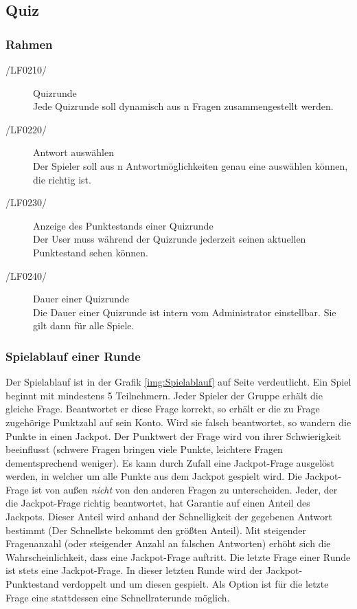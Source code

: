 \documentclass[11pt,a4paper]{scrreprt}
\begin{document}
\subsection{Quiz}

\subsubsection{Rahmen}\label{sssec:Rahmen}
\begin{description}

\item[/LF0210/] Quizrunde \\
Jede Quizrunde soll dynamisch aus n Fragen zusammengestellt werden.

\item[/LF0220/] Antwort auswählen \\
Der Spieler soll aus n Antwortmöglichkeiten genau eine auswählen können, die richtig ist.

\item[/LF0230/]Anzeige des Punktestands einer Quizrunde \\ 
Der User muss während der Quizrunde jederzeit seinen aktuellen Punktestand sehen können.

\item[/LF0240/] Dauer einer Quizrunde \\
Die Dauer einer Quizrunde ist intern vom Administrator einstellbar. Sie gilt dann für alle Spiele.
\end{description}

\subsubsection{Spielablauf einer Runde}
Der Spielablauf ist in der Grafik \ref{img:Spielablauf} auf Seite \pageref{img:Spielablauf} verdeutlicht.
Ein Spiel beginnt mit mindestens 5 Teilnehmern. Jeder Spieler der Gruppe erhält die gleiche Frage. Beantwortet er diese Frage korrekt, so erhält er die zu Frage zugehörige Punktzahl auf sein Konto. Wird sie falsch beantwortet, so wandern die Punkte in einen Jackpot. Der Punktwert der Frage wird von ihrer Schwierigkeit beeinflusst (schwere Fragen bringen viele Punkte, leichtere Fragen dementsprechend weniger). Es kann durch Zufall eine Jackpot-Frage ausgelöst werden, in welcher um alle Punkte aus dem Jackpot gespielt wird. Die Jackpot-Frage ist von außen \textit{nicht} von den anderen Fragen zu unterscheiden. Jeder, der die Jackpot-Frage richtig beantwortet, hat Garantie auf einen Anteil des Jackpots. Dieser Anteil wird anhand der Schnelligkeit der gegebenen Antwort bestimmt (Der Schnellste bekommt den größten Anteil). Mit steigender Fragenanzahl (oder steigender Anzahl an falschen Antworten) erhöht sich die Wahrscheinlichkeit, dass eine Jackpot-Frage auftritt. Die letzte Frage einer Runde ist stets eine Jackpot-Frage. In dieser letzten Runde wird der Jackpot-Punktestand verdoppelt und um diesen gespielt. Als Option ist für die letzte Frage eine stattdessen eine Schnellraterunde möglich.
\end{document}
